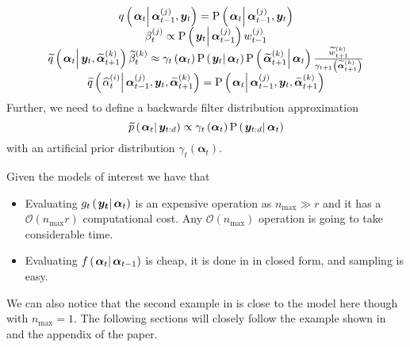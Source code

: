 \documentclass[notitlepage]{article}
\renewcommand{\vec}[1]{\bm{#1}}
\newcommand{\Lparen}[1]{\left( #1\right)}
\newcommand{\Cond}[2]{\left. #1 \vphantom{#2} \right\vert  #2}
\newcommand{\Prob}{\text{P}}
\newcommand{\optor}[2]{#1\Lparen{#2}}
\newcommand{\optorC}[3]{\optor{#1}{\Cond{#2}{#3}}}
\newcommand{\propC}[2]{\optorC{\Prob}{#1}{#2}}
\newcommand{\propAproxC}[2]{\optorC{\widetilde{p}}{#1}{#2}}
\newcommand{\IDC}[2]{\optorC{q}{#1}{#2}}
\newcommand{\IDAproxC}[2]{\optorC{\widetilde{q}}{#1}{#2}}
\newcommand{\partic}[3]{#1_{#2}^{\Lparen{#3}}}
\newcommand{\particB}[3]{\widetilde{#1}_{#2}^{\Lparen{#3}}}
\newcommand{\particS}[3]{\widehat{#1}_{#2}^{\Lparen{#3}}}
\newcommand{\bigO}[1]{\mathcal{O}\Lparen{#1}}
\newcommand{\dimRng}{r}
\newcommand{\nPeriods}{d}
\newcommand{\nMax}{n_{\text{max}}}
\begin{document}
\begin{equation}\begin{matrix}
	\IDC{\vec{\alpha}_t}{\partic{\vec{\alpha}}{t-1}{j}, \vec{y}_t} = \propC{\vec{\alpha}_t}{\partic{\vec{\alpha}}{t-1}{j}, \vec{y}_t} \\
	\partic{\beta}{t}{j} \propto \propC{\vec{y}_t}{\partic{\vec{\alpha}}{t-1}{j}}\partic{w}{t-1}{j} \\
%
	\IDAproxC{\vec{\alpha}_t}{\vec{y}_t, \particB{\vec{\alpha}}{t + 1}{k}}\particB{\beta}{t}{k} \approx %
		\gamma_t\Lparen{\vec{\alpha}_t}
		\propC{\vec{y}_t}{\vec{\alpha}_t}
		\propC{\particB{\vec{\alpha}}{t + 1}{k}}{\vec{\alpha}_t}
		\frac{\particB{w}{t + 1}{k}}{\gamma_{t + 1}\Lparen{\particB{\vec{\alpha}}{t + 1}{k}}} \\
%
	\IDAproxC{\particS{\alpha}{t}{i}}{\partic{\vec{\alpha}}{t-1}{j},\vec{y}_t, \particB{\vec{\alpha}}{t+1}{k}} =
		\propC{\vec{\alpha}_t}{\partic{\vec{\alpha}}{t-1}{j},\vec{y}_t, \particB{\vec{\alpha}}{t+1}{k}}
\end{matrix}\end{equation}%
%
Further, we need to define a backwards filter distribution approximation%
%
\begin{equation}
	\propAproxC{\vec{\alpha}_t}{\vec{y}_{t:\nPeriods}} \propto \gamma_t \Lparen{\vec{\alpha}_t}\propC{\vec{y}_{t:\nPeriods}}{\vec{\alpha}_t}
\end{equation}%
%
with an artificial prior distribution $\gamma_t \Lparen{\vec{\alpha}_t}$.

Given the models of interest we have that

\begin{itemize}
	\item Evaluating $\optorC{g_t}{\vec{y_t}}{\vec{\alpha}_t}$ is an expensive operation as $\nMax \gg \dimRng$ and it has a $\bigO{\nMax\dimRng}$ computational cost. Any $\bigO{\nMax}$ operation is going to take considerable time.
	\item Evaluating $\optorC{f}{\vec{\alpha}_t}{\vec{\alpha}_{t -1}}$ is cheap, it is done in in closed form, and sampling is easy.
\end{itemize}

We can also notice that the second example in \cite{fearnhead10} is close to the model here though with $\nMax = 1$. The following sections will closely follow the example shown in \cite{fearnhead10} and the appendix of the paper.
\end{document}

